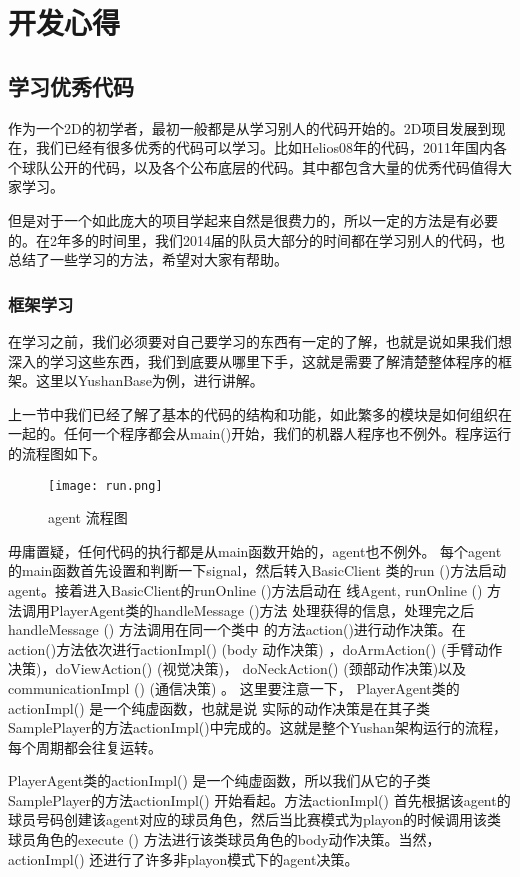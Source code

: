\section{开发心得}

\subsection{学习优秀代码}
作为一个2D的初学者，最初一般都是从学习别人的代码开始的。2D项目发展到现在，我们已经有很多优秀的代码可以学习。比如Helios08年的代码，2011年国内各个球队公开的代码，以及各个公布底层的代码。其中都包含大量的优秀代码值得大家学习。

但是对于一个如此庞大的项目学起来自然是很费力的，所以一定的方法是有必要的。在2年多的时间里，我们2014届的队员大部分的时间都在学习别人的代码，也总结了一些学习的方法，希望对大家有帮助。

\subsubsection{框架学习}
在学习之前，我们必须要对自己要学习的东西有一定的了解，也就是说如果我们想深入的学习这些东西，我们到底要从哪里下手，这就是需要了解清楚整体程序的框架。这里以YushanBase为例，进行讲解。

上一节中我们已经了解了基本的代码的结构和功能，如此繁多的模块是如何组织在一起的。任何一个程序都会从main()开始，我们的机器人程序也不例外。程序运行的流程图如下。
	\begin{figure}[H]
		\centering\texttt{[image: run.png]}	
		\caption{ agent 流程图}
	\end{figure}


毋庸置疑，任何代码的执行都是从main函数开始的，agent也不例外。
每个agent的main函数首先设置和判断一下signal，然后转入BasicClient
类的run ()方法启动agent。接着进入BasicClient的runOnline ()方法启动在
线Agent, runOnline () 方法调用PlayerAgent类的handleMessage ()方法
处理获得的信息，处理完之后handleMessage () 方法调用在同一个类中
的方法action()进行动作决策。在action()方法依次进行actionImpl() (body
动作决策) ，doArmAction() (手臂动作决策)，doViewAction() (视觉决策)，
doNeckAction() (颈部动作决策)以及communicationImpl () (通信决策) 。
这里要注意一下， PlayerAgent类的actionImpl() 是一个纯虚函数，也就是说
实际的动作决策是在其子类SamplePlayer的方法actionImpl()中完成的。这就是整个Yushan架构运行的流程，每个周期都会往复运转。

PlayerAgent类的actionImpl() 是一个纯虚函数，所以我们从它的子类SamplePlayer的方法actionImpl() 开始看起。方法actionImpl() 首先根据该agent的球员号码创建该agent对应的球员角色，然后当比赛模式为playon的时候调用该类球员角色的execute () 方法进行该类球员角色的body动作决策。当然， actionImpl() 还进行了许多非playon模式下的agent决策。

